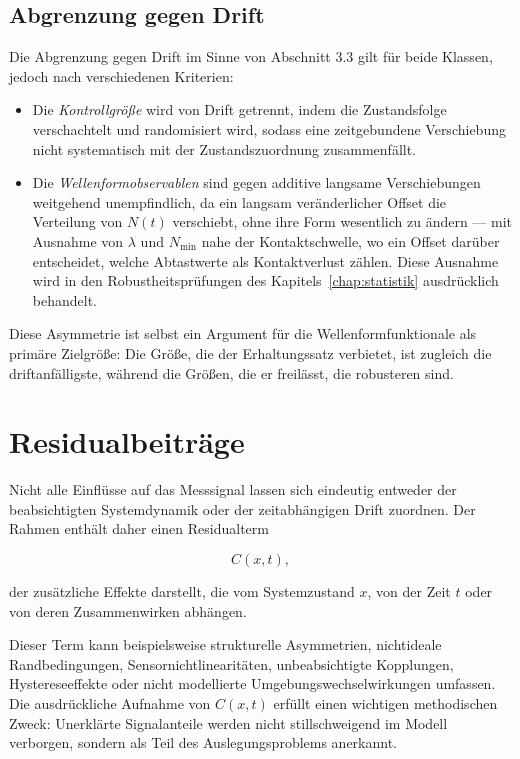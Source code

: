\documentclass[12pt,a4paper]{report}
\begin{document}
\subsection{Abgrenzung gegen Drift}

Die Abgrenzung gegen Drift im Sinne von Abschnitt 3.3 gilt für beide
Klassen, jedoch nach verschiedenen Kriterien:

\begin{itemize}
  \item Die \emph{Kontrollgröße} wird von Drift getrennt, indem die
        Zustandsfolge verschachtelt und randomisiert wird, sodass eine
        zeitgebundene Verschiebung nicht systematisch mit der
        Zustandszuordnung zusammenfällt.
  \item Die \emph{Wellenformobservablen} sind gegen additive langsame
        Verschiebungen weitgehend unempfindlich, da ein langsam
        veränderlicher Offset die Verteilung von $N(t)$ verschiebt, ohne
        ihre Form wesentlich zu ändern --- mit Ausnahme von $\lambda$ und
        $N_{\min}$ nahe der Kontaktschwelle, wo ein Offset darüber
        entscheidet, welche Abtastwerte als Kontaktverlust zählen. Diese
        Ausnahme wird in den Robustheitsprüfungen des Kapitels~\ref{chap:statistik}
        ausdrücklich behandelt.
\end{itemize}

Diese Asymmetrie ist selbst ein Argument für die Wellenformfunktionale
als primäre Zielgröße: Die Größe, die der Erhaltungssatz verbietet, ist
zugleich die driftanfälligste, während die Größen, die er freilässt, die
robusteren sind.

\section{Residualbeiträge}

Nicht alle Einflüsse auf das Messsignal lassen sich eindeutig entweder
der beabsichtigten Systemdynamik oder der zeitabhängigen Drift zuordnen.
Der Rahmen enthält daher einen Residualterm

\begin{equation}
C(x,t),
\end{equation}

der zusätzliche Effekte darstellt, die vom Systemzustand $x$, von der
Zeit $t$ oder von deren Zusammenwirken abhängen.

Dieser Term kann beispielsweise strukturelle Asymmetrien, nichtideale
Randbedingungen, Sensornichtlinearitäten, unbeabsichtigte Kopplungen,
Hystereseeffekte oder nicht modellierte Umgebungswechselwirkungen
umfassen. Die ausdrückliche Aufnahme von $C(x,t)$ erfüllt einen wichtigen
methodischen Zweck: Unerklärte Signalanteile werden nicht stillschweigend
im Modell verborgen, sondern als Teil des Auslegungsproblems anerkannt.
\end{document}
